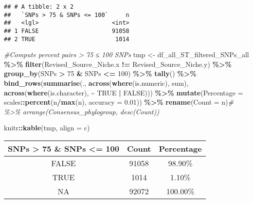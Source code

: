 \documentclass[
]{article}
\newenvironment{Shaded}{\begin{snugshade}}{\end{snugshade}}
\newcommand{\AttributeTok}[1]{\textcolor[rgb]{0.13,0.29,0.53}{#1}}
\newcommand{\CommentTok}[1]{\textcolor[rgb]{0.56,0.35,0.01}{\textit{#1}}}
\newcommand{\ConstantTok}[1]{\textcolor[rgb]{0.56,0.35,0.01}{#1}}
\newcommand{\DecValTok}[1]{\textcolor[rgb]{0.00,0.00,0.81}{#1}}
\newcommand{\FloatTok}[1]{\textcolor[rgb]{0.00,0.00,0.81}{#1}}
\newcommand{\FunctionTok}[1]{\textcolor[rgb]{0.13,0.29,0.53}{\textbf{#1}}}
\newcommand{\NormalTok}[1]{#1}
\newcommand{\OtherTok}[1]{\textcolor[rgb]{0.56,0.35,0.01}{#1}}
\newcommand{\SpecialCharTok}[1]{\textcolor[rgb]{0.81,0.36,0.00}{\textbf{#1}}}
\newcommand{\StringTok}[1]{\textcolor[rgb]{0.31,0.60,0.02}{#1}}
\begin{document}
\begin{verbatim}
## # A tibble: 2 x 2
##   `SNPs > 75 & SNPs <= 100`     n
##   <lgl>                     <int>
## 1 FALSE                     91058
## 2 TRUE                       1014
\end{verbatim}

\begin{Shaded}
\begin{Highlighting}[]
\CommentTok{\#Compute percent pairs \textgreater{} 75 ≤ 100 SNPs}
\NormalTok{tmp }\OtherTok{\textless{}{-}}\NormalTok{ df\_all\_ST\_filtered\_SNPs\_all }\SpecialCharTok{\%\textgreater{}\%} \FunctionTok{filter}\NormalTok{(Revised\_Source\_Niche.x }\SpecialCharTok{!=}\NormalTok{ Revised\_Source\_Niche.y) }\SpecialCharTok{\%\textgreater{}\%} \FunctionTok{group\_by}\NormalTok{(SNPs }\SpecialCharTok{\textgreater{}} \DecValTok{75} \SpecialCharTok{\&}\NormalTok{ SNPs }\SpecialCharTok{\textless{}=} \DecValTok{100}\NormalTok{) }\SpecialCharTok{\%\textgreater{}\%} \FunctionTok{tally}\NormalTok{() }\SpecialCharTok{\%\textgreater{}\%} 
  \FunctionTok{bind\_rows}\NormalTok{(}\FunctionTok{summarise}\NormalTok{(.,}
                      \FunctionTok{across}\NormalTok{(}\FunctionTok{where}\NormalTok{(is.numeric), sum),}
                      \FunctionTok{across}\NormalTok{(}\FunctionTok{where}\NormalTok{(is.character), }\SpecialCharTok{\textasciitilde{}} \ConstantTok{TRUE} \SpecialCharTok{|} \ConstantTok{FALSE}\NormalTok{))) }\SpecialCharTok{\%\textgreater{}\%}
  \FunctionTok{mutate}\NormalTok{(}\AttributeTok{Percentage =}\NormalTok{ scales}\SpecialCharTok{::}\FunctionTok{percent}\NormalTok{(n}\SpecialCharTok{/}\FunctionTok{max}\NormalTok{(n), }\AttributeTok{accuracy =} \FloatTok{0.01}\NormalTok{)) }\SpecialCharTok{\%\textgreater{}\%}
  \FunctionTok{rename}\NormalTok{(}\StringTok{\textquotesingle{}Count\textquotesingle{}} \OtherTok{=}\NormalTok{ n)}\CommentTok{\# \%\textgreater{}\% arrange(Consensus\_phylogroup, desc(Count))}

\NormalTok{knitr}\SpecialCharTok{::}\FunctionTok{kable}\NormalTok{(tmp, }\AttributeTok{align =} \StringTok{\textquotesingle{}c\textquotesingle{}}\NormalTok{)}
\end{Highlighting}
\end{Shaded}

\begin{longtable}[]{@{}ccc@{}}
\toprule\noalign{}
SNPs \textgreater{} 75 \& SNPs \textless= 100 & Count & Percentage \\
\midrule\noalign{}
\endhead
\bottomrule\noalign{}
\endlastfoot
FALSE & 91058 & 98.90\% \\
TRUE & 1014 & 1.10\% \\
NA & 92072 & 100.00\% \\
\end{longtable}
\end{document}
